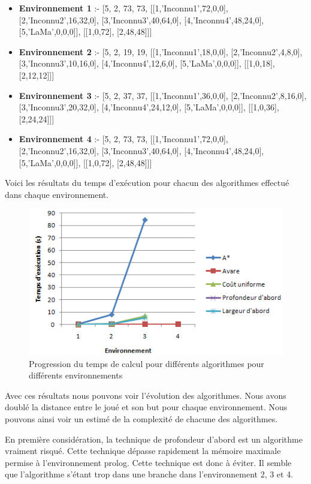 \documentclass[12pt,english,frenchb,letterpaper]{article}
\begin{document}
\begin{itemize}
\item 
\textbf{Environnement 1} :- 
[5, 2, 73, 73, [[1,'Inconnu1',72,0,0], [2,'Inconnu2',16,32,0], [3,'Inconnu3',40,64,0], [4,'Inconnu4',48,24,0], [5,'LaMa',0,0,0]], [[1,0,72], [2,48,48]]]
\item 
\textbf{Environnement 2} :- 
[5, 2, 19, 19, [[1,'Inconnu1',18,0,0], [2,'Inconnu2',4,8,0], [3,'Inconnu3',10,16,0], [4,'Inconnu4',12,6,0], [5,'LaMa',0,0,0]], [[1,0,18], [2,12,12]]]
\item 
\textbf{Environnement 3} :- 
[5, 2, 37, 37, [[1,'Inconnu1',36,0,0], [2,'Inconnu2',8,16,0], [3,'Inconnu3',20,32,0], [4,'Inconnu4',24,12,0], [5,'LaMa',0,0,0]], [[1,0,36], [2,24,24]]]
\item 
\textbf{Environnement 4} :- 
[5, 2, 73, 73, [[1,'Inconnu1',72,0,0], [2,'Inconnu2',16,32,0], [3,'Inconnu3',40,64,0], [4,'Inconnu4',48,24,0], [5,'LaMa',0,0,0]], [[1,0,72], [2,48,48]]]
\end{itemize}


Voici les résultats du temps d'exécution pour chacun des algorithmes effectué dans chaque environnement.

\begin{figure}[!h] %
\includegraphics[width=6in]{resultats-planif} %
\caption{Progression du temps de calcul pour différents algorithmes pour différents environnements} 
\end{figure}

Avec ces résultats nous pouvons voir l'évolution des algorithmes. Nous avons doublé la distance entre le joué et son but pour chaque environnement. Nous pouvons ainsi voir un estimé de la complexité de chacune des algorithmes.

En première considération, la technique de profondeur d'abord est un algorithme vraiment risqué. Cette technique dépasse rapidement la mémoire maximale permise à l'environnement prolog. Cette technique est donc à éviter. Il semble que l'algorithme s'étant trop dans une branche dans l'environnement 2, 3 et 4.
\end{document}
